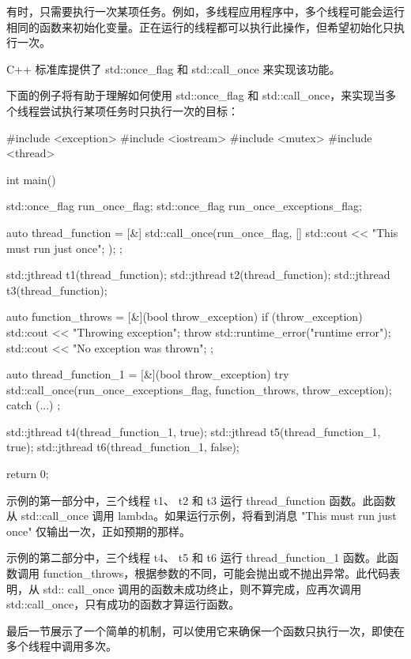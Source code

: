 有时，只需要执行一次某项任务。例如，多线程应用程序中，多个线程可能会运行相同的函数来初始化变量。正在运行的线程都可以执行此操作，但希望初始化只执行一次。

C++ 标准库提供了 std::once\_flag 和 std::call\_once 来实现该功能。

下面的例子将有助于理解如何使用 std::once\_flag 和 std::call\_once，来实现当多个线程尝试执行某项任务时只执行一次的目标：

\begin{cpp}
#include <exception>
#include <iostream>
#include <mutex>
#include <thread>

int main() {
    std::once_flag run_once_flag;
    std::once_flag run_once_exceptions_flag;

    auto thread_function = [&] {
        std::call_once(run_once_flag, []{
            std::cout << "This must run just once\n";
        });
    };

    std::jthread t1(thread_function);
    std::jthread t2(thread_function);
    std::jthread t3(thread_function);

    auto function_throws = [&](bool throw_exception) {
        if (throw_exception) {
            std::cout << "Throwing exception\n";
            throw std::runtime_error("runtime error");
        }
        std::cout << "No exception was thrown\n";
    };

    auto thread_function_1 = [&](bool throw_exception) {
        try {
            std::call_once(run_once_exceptions_flag,
            function_throws,
            throw_exception);
        }
        catch (...) {
        }
    };

    std::jthread t4(thread_function_1, true);
    std::jthread t5(thread_function_1, true);
    std::jthread t6(thread_function_1, false);

    return 0;
}
\end{cpp}

示例的第一部分中，三个线程 t1、 t2 和 t3 运行 thread\_function 函数。此函数从 std::call\_once 调用 lambda。如果运行示例，将看到消息 "This must run just once" 仅输出一次，正如预期的那样。

示例的第二部分中，三个线程 t4、 t5 和 t6 运行 thread\_function\_1 函数。此函数调用 function\_throws，根据参数的不同，可能会抛出或不抛出异常。此代码表明，从 std:: call\_once 调用的函数未成功终止，则不算完成，应再次调用 std::call\_once，只有成功的函数才算运行函数。

最后一节展示了一个简单的机制，可以使用它来确保一个函数只执行一次，即使在多个线程中调用多次。








































